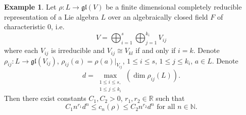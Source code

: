 \documentclass[12pt, reqno, a4paper]{amsart}
\theoremstyle{plain}
\theoremstyle{remark}
\theoremstyle{definition}
\newtheorem{example}{Example}
\begin{document}
\begin{example}\label{ExampleComplReduc}
Let $\rho \colon L \to \mathfrak{gl}(V)$ be a finite dimensional
completely reducible representation of a Lie algebra $L$
over an algebraically closed field $F$ of characteristic $0$,
i.e.
$$V = \bigoplus_{i=1}^s \bigoplus_{j=1}^{k_i} V_{ij}$$
where each $V_{ij}$ is irreducible and
 $V_{ij}\cong V_{kl}$ if and only if $i=k$. Denote
$\rho_{ij} \colon L \to \mathfrak{gl}(V_{ij})$,
$\rho_{ij}(a)=\rho(a)\bigl|_{V_{ij}}$, $1 \leqslant i \leqslant s$,
$1 \leqslant j \leqslant k_i$,
$a \in L$. Denote $$d=\max_{\substack{1 \leqslant i \leqslant s,
\\ 1 \leqslant j \leqslant k_i}} \left( \dim \rho_{ij}(L) \right).$$ Then
there exist constants $C_1, C_2 > 0$, $r_1, r_2 \in \mathbb R$
such that $$C_1 n^{r_1} d^n \leqslant c_n(\rho) \leqslant C_2 n^{r_2} d^n \text{ for all } n \in \mathbb N.$$
\end{example}
\end{document}
